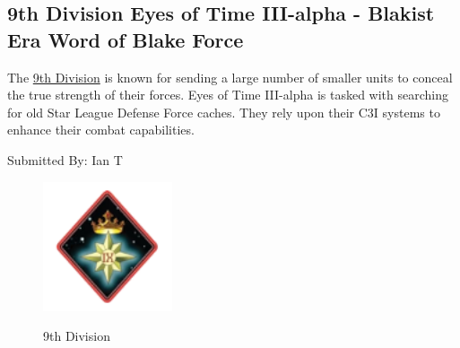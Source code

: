 \subsection{9th Division Eyes of Time III-alpha - Blakist Era Word of Blake Force}

The \href{https://www.sarna.net/wiki/9th_Division_(Word_of_Blake)}{9th Division} is known for sending a large number of smaller units to conceal the true strength of their forces.
Eyes of Time III-alpha is tasked with searching for old Star League Defense Force caches.
They rely upon their C3I systems to enhance their combat capabilities.

Submitted By: Ian T

\begin{figure}[!h]
  \centering
  \includegraphics[alt='9th Division Logo', width=1.5in, height=1.5in]{img/9th-Division.png}
  \caption*{9th Division}
\end{figure}

